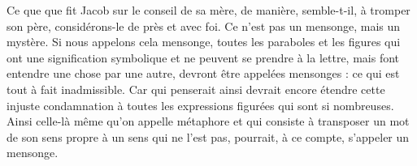  Ce que que fit Jacob sur le conseil de sa mère, de manière, semble-t-il, à tromper son père, considérons-le de près et avec foi. Ce n’est pas un mensonge, mais un mystère. Si nous appelons cela mensonge, toutes les paraboles et les figures qui ont une signification symbolique et ne peuvent se prendre à la lettre, mais font entendre une chose par une autre, devront être appelées mensonges : ce qui est tout à fait inadmissible. Car qui penserait ainsi devrait encore étendre cette injuste condamnation à toutes les expressions figurées qui sont si nombreuses. Ainsi celle-là même qu’on appelle métaphore et qui consiste à transposer un mot de son sens propre à un sens qui ne l’est pas, pourrait, à ce compte, s’appeler un mensonge.